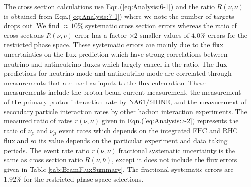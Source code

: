 The cross section calculations use Eqn.(\ref{eq:Analysis:6-1})
and the ratio $R(\nu,\overline{\nu})$ is obtained from Eqn.(\ref{eq:Analysis:7-1}) where
we note the number of targets drops out. 
We find $\approx 10\%$
systematic cross section
errors whereas the ratio of cross sections $R(\nu,\overline{\nu})$ error
has a factor $\times2$
smaller values of $4.0\%$ 
errors for the restricted 
phase space.
These systematic errors are mainly due to the flux uncertainties 
on the flux prediction which
have strong correlations between neutrino and antineutrino fluxes
which largely cancel in the ratio.  %
The flux predictions for neutrino mode and antineutrino mode are correlated through measurements that are used as inputs to the flux calculation.  These measurements include the proton beam current measurement, the measurement of the primary proton interaction rate by NA61/SHINE, and the measurement of secondary particle interaction rates by other hadron interaction experiments.
The measured ratio of rates  $r(\nu,\overline{\nu})$  
given in Eqn.(\ref{eq:Analysis:7-2}) represents the ratio
of $\nu_\mu$ and $\bar\nu_\mu$ event rates which depends on the integrated
FHC and RHC flux and so its value depends on the particular experiment and data taking periods.
The event rate ratio $r(\nu,\overline{\nu})$  
fractional systematic uncertainty is the same as 
cross section ratio
$R(\nu,\overline{\nu})$, except
it does not include the flux errors given in Table \ref{tab:BeamFluxSummary}. The fractional 
systematic errors are $1.92\%$ 
for the restricted 
phase space selections.


